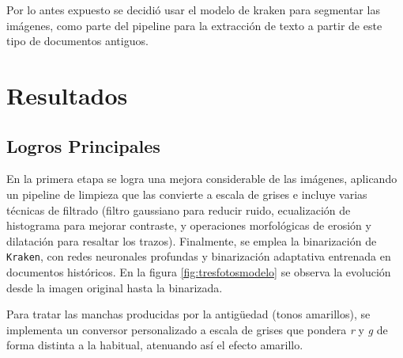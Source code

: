 \documentclass[11pt,a4paper]{article}
\begin{document}
Por lo antes expuesto se decidió usar el modelo de kraken para segmentar las imágenes, como parte del pipeline para la extracción de texto a partir de este tipo de documentos antiguos.


\section{Resultados}
\subsection{Logros Principales}

En la primera etapa se logra una mejora considerable de las imágenes, aplicando un pipeline de limpieza que las convierte a escala de grises e incluye varias técnicas de filtrado (filtro gaussiano para reducir ruido, ecualización de histograma para mejorar contraste, y operaciones morfológicas de erosión y dilatación para resaltar los trazos). Finalmente, se emplea la binarización de \texttt{Kraken}, con redes neuronales profundas y binarización adaptativa entrenada en documentos históricos. En la figura \ref{fig:tresfotosmodelo} se observa la evolución desde la imagen original hasta la binarizada.

Para tratar las manchas producidas por la antigüedad (tonos amarillos), se implementa un conversor personalizado a escala de grises que pondera \textit{r} y \textit{g} de forma distinta a la habitual, atenuando así el efecto amarillo.
\end{document}
